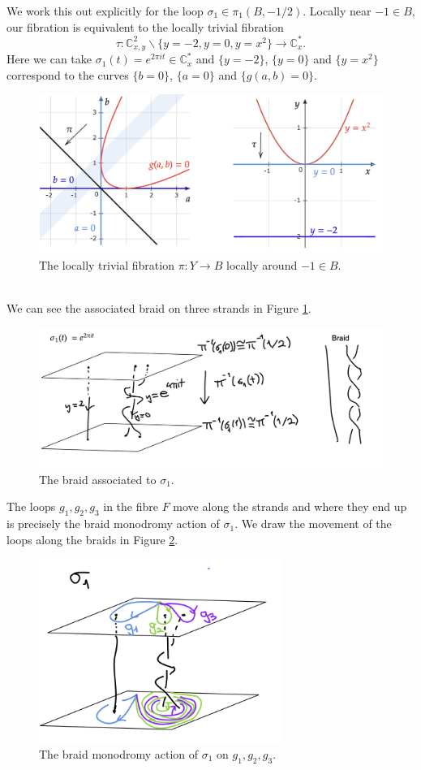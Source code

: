 \documentclass[oneside,reqno]{amsart}
\theoremstyle{definition}
\theoremstyle{definition}
\theoremstyle{definition}
\theoremstyle{definition}
\newcommand{\CC}{\mathbb{C}}
\begin{document}
\newline
We work this out explicitly for the loop $\sigma_1\in \pi_1(B,-1/2)$. Locally near $-1 \in B$, our fibration is equivalent to the locally trivial fibration 
$$\tau : \CC^2_{x,y}\backslash \{ y=-2, y=0, y=x^2\} \to \CC_x^*.$$
Here we can take $\sigma_1(t) = e^{2\pi it} \in \CC_x^*$ and $\{ y=-2\}$, $\{y=0\}$ and $\{y =x^2\}$ correspond to the curves $\{b=0\}$, $\{a=0\}$ and $\{ g(a,b)=0\}$. 
\begin{figure}[!h]
    \centering
    \includegraphics[width=12cm]{rank2exmp/exmp1tau.png}
    \caption{The locally trivial fibration $\pi: Y \to B$ locally around $-1 \in B$.}
\end{figure}
\\
We can see the associated braid on three strands in Figure \ref{sigma1}.
\begin{figure}[!h]
    \centering
    \includegraphics[width=12cm]{rank2exmp/sigma1.png}
    \caption{The braid associated to $\sigma_1$.}
    \label{sigma1}
\end{figure}
The loops $g_1,g_2,g_3$ in the fibre $F$ move along the strands and where they end up is precisely the braid monodromy action of $\sigma_1$. We draw the movement of the loops along the braids in Figure \ref{braidaction1}.
\begin{figure}[!h]
    \centering
    \includegraphics[width=8cm]{rank2exmp/braidaction1.png}
    \caption{The braid monodromy action of $\sigma_1$ on $g_1,g_2,g_3$.}
    \label{braidaction1}
\end{figure}
\end{document}
